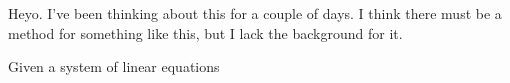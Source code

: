 \documentclass[11pt]{article}
\begin{document}
Heyo. I've been thinking about this for a couple of days. I think there must be
a method for something like this, but I lack the background for it.

Given a system of linear equations




\end{document}
